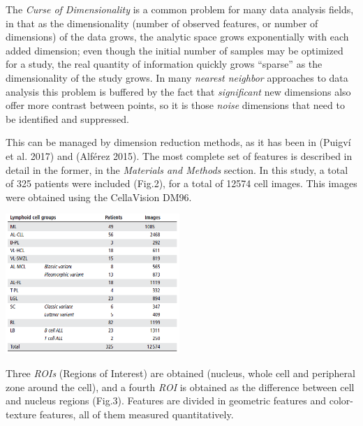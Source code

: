 \documentclass[]{article}
\let\origfigure\figure
\let\endorigfigure\endfigure
\renewenvironment{figure}[1][2] {
    \expandafter\origfigure\expandafter[H]
} {
    \endorigfigure
}
\begin{document}
The \emph{Curse of Dimensionality} is a common problem for many data
analysis fields, in that as the dimensionality (number of observed
features, or number of dimensions) of the data grows, the analytic space
grows exponentially with each added dimension; even though the initial
number of samples may be optimized for a study, the real quantity of
information quickly grows ``sparse'' as the dimensionality of the study
grows. In many \emph{nearest neighbor} approaches to data analysis this
problem is buffered by the fact that \emph{significant} new dimensions
also offer more contrast between points, so it is those \emph{noise}
dimensions that need to be identified and suppressed.

This can be managed by dimension reduction methods, as it has been in
(Puigv{í} et al. 2017) and (Alf{é}rez 2015). The most complete set of
features is described in detail in the former, in the \emph{Materials
and Methods} section. In this study, a total of 325 patients were
included (Fig.2), for a total of 12574 cell images. This images were
obtained using the CellaVision DM96.

\begin{figure}[h]

{\centering \includegraphics[height=200px,]{./images/4-distribution-images} 

}

\caption{Distribution of lymphoid cell groups, number of patients and images included in the study (Source: Puigví et al.)}\label{Fig. distribution}
\end{figure}

Three \emph{ROIs} (Regions of Interest) are obtained (nucleus, whole
cell and peripheral zone around the cell), and a fourth \emph{ROI} is
obtained as the difference between cell and nucleus regions (Fig.3).
Features are divided in geometric features and color-texture features,
all of them measured quantitatively.
\end{document}
